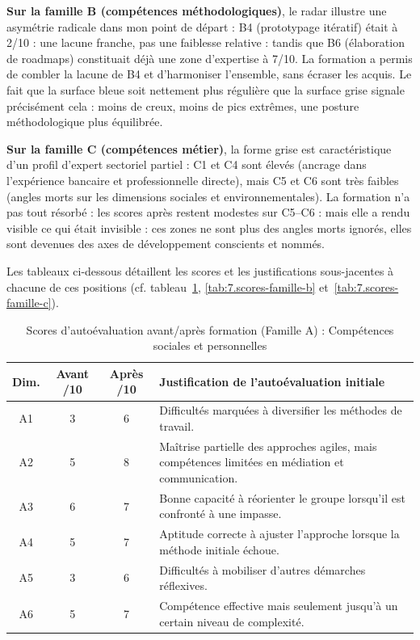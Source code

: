 \textbf{Sur la famille B (compétences méthodologiques)}, le radar illustre une asymétrie radicale dans mon point de départ : B4 (prototypage itératif) était à 2/10 : une lacune franche, pas une faiblesse relative : tandis que B6 (élaboration de roadmaps) constituait déjà une zone d'expertise à 7/10. La formation a permis de combler la lacune de B4 et d'harmoniser l'ensemble, sans écraser les acquis. Le fait que la surface bleue soit nettement plus régulière que la surface grise signale précisément cela : moins de creux, moins de pics extrêmes, une posture méthodologique plus équilibrée.

\textbf{Sur la famille C (compétences métier)}, la forme grise est caractéristique d'un profil d'expert sectoriel partiel : C1 et C4 sont élevés (ancrage dans l'expérience bancaire et professionnelle directe), mais C5 et C6 sont très faibles (angles morts sur les dimensions sociales et environnementales). La formation n'a pas tout résorbé : les scores après restent modestes sur C5--C6 : mais elle a rendu visible ce qui était invisible : ces zones ne sont plus des angles morts ignorés, elles sont devenues des axes de développement conscients et nommés.

\medskip
Les tableaux ci-dessous détaillent les scores et les justifications sous-jacentes à chacune de ces positions (cf. tableau~\ref{tab:7.scores-famille-a}, \ref{tab:7.scores-famille-b} et~\ref{tab:7.scores-famille-c}).


\begin{table}[h!]
  \centering
  \caption{Scores d'autoévaluation avant/après formation (Famille A) : Compétences sociales et personnelles}
  \label{tab:7.scores-famille-a}
  \smallskip
  \begin{tabularx}{\textwidth}{@{} c c c X @{}}
    \toprule
    \textbf{Dim.} & \textbf{Avant /10} & \textbf{Après /10} & \textbf{Justification de l'autoévaluation initiale} \\
    \midrule
    A1 & 3 & 6 & Difficultés marquées à diversifier les méthodes de travail. \\
    A2 & 5 & 8 & Maîtrise partielle des approches agiles, mais compétences limitées en médiation et communication. \\
    A3 & 6 & 7 & Bonne capacité à réorienter le groupe lorsqu'il est confronté à une impasse. \\
    A4 & 5 & 7 & Aptitude correcte à ajuster l'approche lorsque la méthode initiale échoue. \\
    A5 & 3 & 6 & Difficultés à mobiliser d'autres démarches réflexives. \\
    A6 & 5 & 7 & Compétence effective mais seulement jusqu'à un certain niveau de complexité. \\
    \bottomrule
  \end{tabularx}
\end{table}

